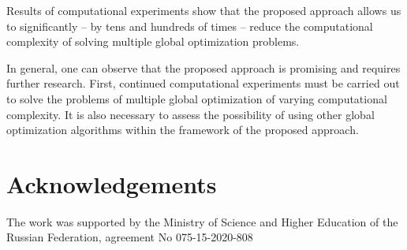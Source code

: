 \documentclass[review]{elsarticle}
\begin{document}
Results of computational experiments show that the proposed approach allows us to significantly -- by tens and hundreds of times -- reduce the computational complexity of solving multiple global optimization problems.

In general, one can observe that the proposed approach is promising and requires further research. First, continued computational experiments must be carried out to solve the problems of multiple global optimization of varying computational complexity. It is also necessary to assess the possibility of using other global optimization algorithms within the framework of the proposed approach.

\section*{Acknowledgements} 
The work was supported by the Ministry of Science and Higher Education of the Russian Federation, agreement No 075-15-2020-808
\end{document}
